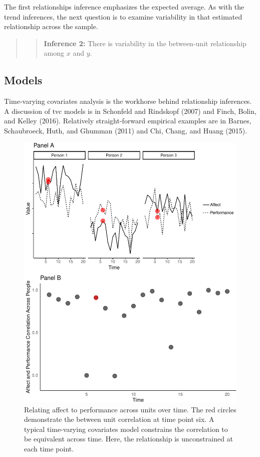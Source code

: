 \documentclass[english,,man]{apa6}
\theoremstyle{definition}
\theoremstyle{definition}
\theoremstyle{definition}
\theoremstyle{remark}
\begin{document}
The first relationships inference emphasizes the expected average. As
with the trend inferences, the next question is to examine variability
in that estimated relationship across the sample.

\begin{quote}
\begin{quote}
\textbf{Inference 2:} There is variability in the between-unit
relationship among \(x\) and \(y\).
\end{quote}
\end{quote}

\hypertarget{models-1}{%
\subsection{Models}\label{models-1}}

Time-varying covariates analysis is the workhorse behind relationship
inferences. A discussion of tvc models is in Schonfeld and Rindskopf
(2007) and Finch, Bolin, and Kelley (2016). Relatively straight-forward
empirical examples are in Barnes, Schaubroeck, Huth, and Ghumman (2011)
and Chi, Chang, and Huang (2015).

\begin{figure}
\centering
\includegraphics{figures/unnamed-chunk-14-1.pdf}
\caption{\label{fig:unnamed-chunk-14}Relating affect to performance across
units over time. The red circles demonstrate the between unit
correlation at time point six. A typical time-varying covariates model
constrains the correlation to be equivalent across time. Here, the
relationship is unconstrained at each time point.\label{relation_tvc}}
\end{figure}
\end{document}
